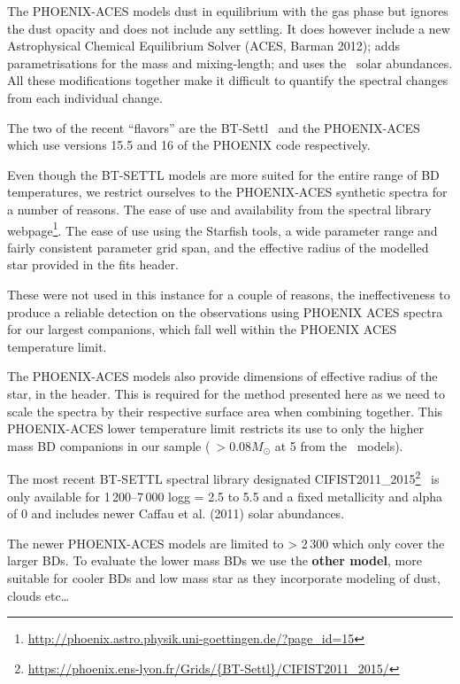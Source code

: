 The {PHOENIX-ACES} models dust in equilibrium with the gas phase but ignores the dust opacity and does not include any settling. It does however include a new Astrophysical Chemical Equilibrium Solver (ACES,
Barman 2012); adds parametrisations for the mass and mixing-length; and uses the~\citet{asplund_chemical_2009} solar abundances. All these modifications together make it difficult to quantify the spectral changes from each individual change.

The two of the recent ``flavors'' are the {BT-Settl}~\citep{allard_model_2010, baraffe_new_2015} and the {PHOENIX-ACES}~\citep{husser_new_2013} which use versions 15.5 and 16 of the PHOENIX code respectively.

Even though the BT-SETTL models are more suited for the entire range of BD temperatures, we restrict ourselves to the {PHOENIX-ACES} synthetic spectra for a number of reasons. The ease of use and availability from the spectral library webpage\footnote{\url{http://phoenix.astro.physik.uni-goettingen.de/?page_id=15}}. The ease of use using the Starfish tools, a wide parameter range and fairly consistent parameter grid span, and the effective radius of the modelled star provided in the fits header.

These were not used in this instance for a couple of reasons, the ineffectiveness to produce a reliable detection on the observations using PHOENIX ACES spectra for our largest companions, which fall well within the PHOENIX ACES temperature limit.

The {PHOENIX-ACES} models also provide dimensions of effective radius of the star, in the header. This is required for the method presented here as we need to scale the spectra by their respective surface area when combining together.
This {PHOENIX-ACES} lower temperature limit restricts its use to only the higher mass BD companions in our sample (\(~>0.08 M_{\odot}\) at 5\Gyr{} from the~\citet{baraffe_evolutionary_2003} models).


The most recent BT-SETTL spectral library designated CIFIST2011\_2015\footnote{\url{https://phoenix.ens-lyon.fr/Grids/{BT-Settl}/CIFIST2011_2015/}}~\citep{baraffe_new_2015} is only available for 1\,200--7\,000\K{} logg = 2.5 to 5.5 and a fixed metallicity and alpha of 0 and includes newer Caffau et al. (2011) solar abundances.

The newer {PHOENIX-ACES} models are limited to \teff{}> 2\,300\K{} which only cover the larger BDs. To evaluate the lower mass BDs we use the \textbf{other model}, more suitable for cooler BDs and low mass star as they incorporate modeling of dust, clouds etc\ldots


